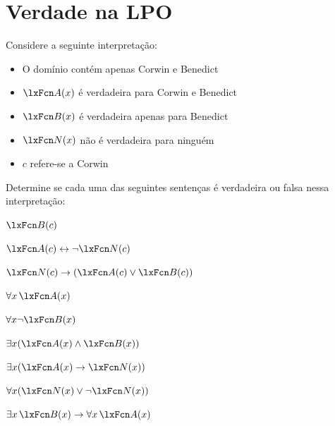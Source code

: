 

\chapter{Verdade na LPO}\setcounter{ProbPart}{0}
\problempart
\label{pr.TorF1}
Considere a seguinte interpretação:
	\begin{itemize}
		\item O domínio contém apenas Corwin e Benedict
		\item $\atom{A}{x}$ é verdadeira para Corwin e Benedict
		\item $\atom{B}{x}$ é verdadeira apenas para Benedict
		\item $\atom{N}{x}$ não é verdadeira para ninguém
		\item $c$ refere-se a Corwin
	\end{itemize}
Determine se cada uma das seguintes sentenças é verdadeira ou falsa nessa interpretação:
\begin{compactlist}
\item $\atom{B}{c}$ \hfill {}
\item $\atom{A}{c} \eiff \enot \atom{N}{c}$ \hfill {}
\item $\atom{N}{c} \eif (\atom{A}{c} \eor \atom{B}{c})$ \hfill {}
\item $\forall x\,\atom{A}{x}$ \hfill {}
\item $\forall x \enot \atom{B}{x}$ \hfill {}
\item $\exists x(\atom{A}{x} \eand \atom{B}{x})$ \hfill {}
\item $\exists x(\atom{A}{x} \eif \atom{N}{x})$ \hfill {}
\item $\forall x(\atom{N}{x} \eor \enot \atom{N}{x})$ \hfill {}
\item $\exists x\,\atom{B}{x} \eif \forall x\,\atom{A}{x}$ \hfill {}
\end{compactlist}

